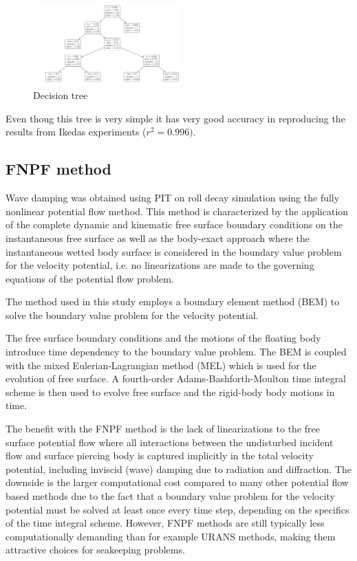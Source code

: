     \begin{figure}[H]
        \begin{center}\includegraphics[width = 0.5\textwidth]{figures/decision_tree.pdf}\end{center}
        \vspace{-1cm}
        \caption{Decision tree}
        \label{fig:decision_tree}
    \end{figure}
    
    Even thoug this tree is very simple it has very good accuracy in
reproducing the results from Ikedas experiments ($r^2=0.996)$.

    \subsection{FNPF method}\label{fnpf-method}

\label{fnpf-method} Wave damping was obtained using PIT on roll decay
simulation using the fully nonlinear potential flow method. This method
is characterized by the application of the complete dynamic and
kinematic free surface boundary conditions on the instantaneous free
surface as well as the body-exact approach where the instantaneous
wetted body surface is considered in the boundary value problem for the
velocity potential, i.e. no linearizations are made to the governing
equations of the potential flow problem.

The method used in this study employs a boundary element method (BEM)
\cite{7505983/FD4N3DW2} to solve the boundary value problem for the
velocity potential.

The free surface boundary conditions and the motions of the floating
body introduce time dependency to the boundary value problem. The BEM is
coupled with the mixed Eulerian-Lagrangian method (MEL)
\cite{7505983/ZKB494GT} which is used for the evolution of free surface.
A fourth-order Adams-Bashforth-Moulton time integral scheme is then used
to evolve free surface and the rigid-body body motions in time.

The benefit with the FNPF method is the lack of linearizations to the
free surface potential flow where all interactions between the
undisturbed incident flow and surface piercing body is captured
implicitly in the total velocity potential, including inviscid (wave)
damping due to radiation and diffraction. The downside is the larger
computational cost compared to many other potential flow based methods
due to the fact that a boundary value problem for the velocity potential
must be solved at least once every time step, depending on the specifics
of the time integral scheme. However, FNPF methods are still typically
less computationally demanding than for example URANS methods, making
them attractive choices for seakeeping problems.

    